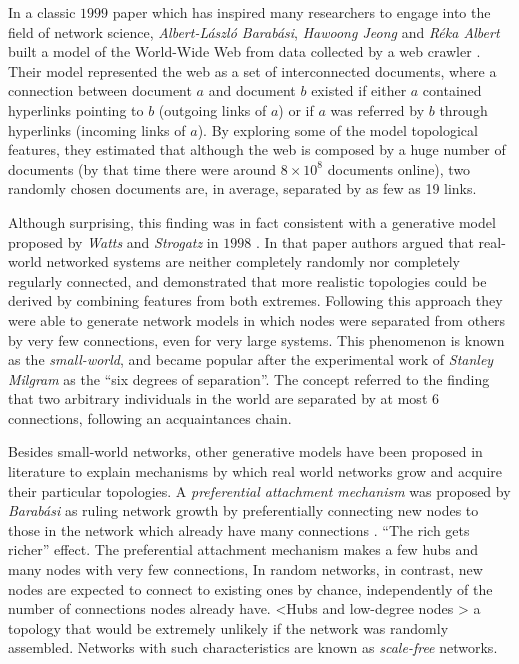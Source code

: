 In a classic $1999$ paper which has inspired many researchers to engage into the field of network science, \textit{Albert-László Barabási}, \textit{Hawoong Jeong} and \textit{Réka Albert} built a model of the World-Wide Web from data collected by a web crawler \cite{Albert1999}. 
Their model represented the web as a set of interconnected documents, where a connection between document $a$ and document $b$ existed if either $a$ contained hyperlinks pointing to $b$ (outgoing links of $a$) or if $a$ was referred by $b$ through hyperlinks (incoming links of $a$).
By exploring some of the model topological features, they estimated that although the web is composed by a huge number of documents (by that time there were around $8 \times 10^8$ documents online), two randomly chosen documents are, in average, separated by as few as 19 links. 

Although surprising, this finding was in fact consistent with a generative model proposed by \textit{Watts} and \textit{Strogatz} in $1998$ \cite{Watts1998}.
In that paper authors argued that real-world networked systems are neither completely randomly nor completely regularly connected, and demonstrated that more realistic topologies could be derived by combining features from both extremes.
Following this approach they were able to generate network models in which nodes were separated from others by very few connections, even for very large systems.
This phenomenon is known as the \textit{small-world}, and became popular after the experimental work of \textit{Stanley Milgram} \cite{Milgram1969} as the ``six degrees of separation''.
The concept referred to the finding that two arbitrary individuals in the world are separated by at most 6 connections, following an acquaintances chain.
 
Besides small-world networks, other generative models have been proposed in literature to explain mechanisms by which real world networks grow and acquire their particular topologies.
A \textit{preferential attachment mechanism} was proposed by \textit{Barabási} as ruling network growth by preferentially connecting new nodes to those in the network which already have many connections \cite{Albert2002}. 
``The rich gets richer'' effect.
The preferential attachment mechanism makes a few hubs and many nodes with very few connections, 
In random networks, in contrast, new nodes are expected to connect to existing ones by chance, independently of the number of connections nodes already have.
<Hubs and low-degree nodes > a topology that would be extremely unlikely if the network was randomly assembled.
Networks with such characteristics are known as \textit{scale-free} networks.



